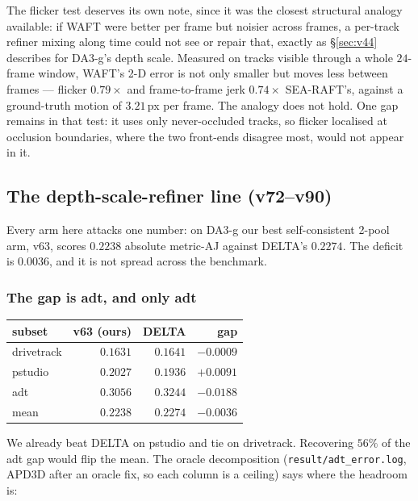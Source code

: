 \documentclass[11pt,a4paper]{article}
\begin{document}
\noindent The flicker test deserves its own note, since it was the closest structural analogy
available: if WAFT were better per frame but noisier across frames, a per-track refiner mixing along
time could not see or repair that, exactly as \S\ref{sec:v44} describes for DA3-g's depth scale.
Measured on tracks visible through a whole $24$-frame window, WAFT's 2-D error is not only smaller
but moves less between frames --- flicker $0.79\times$ and frame-to-frame jerk $0.74\times$
SEA-RAFT's, against a ground-truth motion of $3.21$\,px per frame. The analogy does not hold. One
gap remains in that test: it uses only never-occluded tracks, so flicker localised at occlusion
boundaries, where the two front-ends disagree most, would not appear in it.

\subsection{The depth-scale-refiner line (v72--v90)}
\label{sec:dsr-line}

Every arm here attacks one number: on DA3-g our best self-consistent 2-pool arm, v63, scores
$0.2238$ absolute metric-AJ against DELTA's $0.2274$. The deficit is $0.0036$, and it is not spread
across the benchmark.

\subsubsection{The gap is adt, and only adt}
\label{sec:dsr-where}

\begin{center}\small
\begin{tabular}{lrrr}
\toprule
subset & v63 (ours) & DELTA & gap \\
\midrule
drivetrack & $0.1631$ & $0.1641$ & $-0.0009$ \\
pstudio    & $0.2027$ & $0.1936$ & $\mathbf{+0.0091}$ \\
adt        & $0.3056$ & $0.3244$ & $\mathbf{-0.0188}$ \\
\midrule
mean       & $0.2238$ & $0.2274$ & $-0.0036$ \\
\bottomrule
\end{tabular}
\end{center}

We already beat DELTA on pstudio and tie on drivetrack. Recovering $56\%$ of the adt gap would flip
the mean. The oracle decomposition (\texttt{result/adt\_error.log}, APD3D after an oracle fix, so
each column is a ceiling) says where the headroom is:
\end{document}
